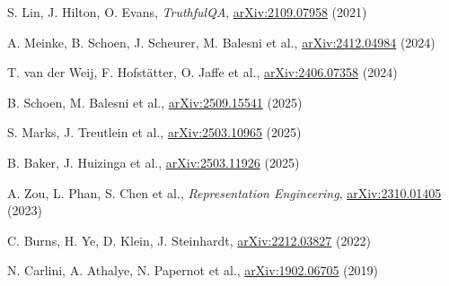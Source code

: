 \documentclass{webofc}
\begin{document}
\begin{thebibliography}{}
S. Lin, J. Hilton, O. Evans, \textit{TruthfulQA}, \href{https://arxiv.org/abs/2109.07958}{arXiv:2109.07958} (2021)

A. Meinke, B. Schoen, J. Scheurer, M. Balesni et al., \href{https://arxiv.org/abs/2412.04984}{arXiv:2412.04984} (2024)

T. van der Weij, F. Hofst\"atter, O. Jaffe et al., \href{https://arxiv.org/abs/2406.07358}{arXiv:2406.07358} (2024)

B. Schoen, M. Balesni et al., \href{https://arxiv.org/abs/2509.15541}{arXiv:2509.15541} (2025)

S. Marks, J. Treutlein et al., \href{https://arxiv.org/abs/2503.10965}{arXiv:2503.10965} (2025)

B. Baker, J. Huizinga et al., \href{https://arxiv.org/abs/2503.11926}{arXiv:2503.11926} (2025)

A. Zou, L. Phan, S. Chen et al., \textit{Representation Engineering}, \href{https://arxiv.org/abs/2310.01405}{arXiv:2310.01405} (2023)

C. Burns, H. Ye, D. Klein, J. Steinhardt, \href{https://arxiv.org/abs/2212.03827}{arXiv:2212.03827} (2022)

N. Carlini, A. Athalye, N. Papernot et al., \href{https://arxiv.org/abs/1902.06705}{arXiv:1902.06705} (2019)

\end{thebibliography}
\end{document}
